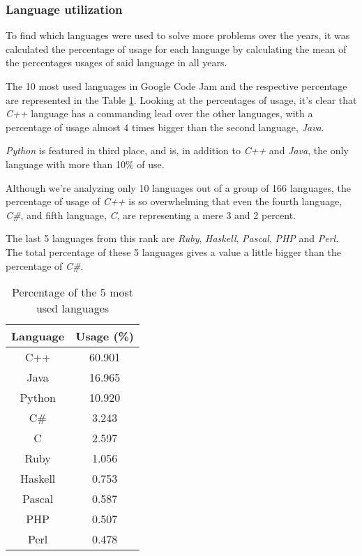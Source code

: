 \documentclass{article}
\begin{document}
\begin{multicols*}{2}
\subsubsection{Language utilization}

To find which languages were used to solve more problems over the years, it was calculated the percentage of usage for each language by calculating the mean of the percentages usages of said language in all years.

The 10 most used languages in Google Code Jam and the respective percentage are represented in the Table \ref{lang_perc}.
Looking at the percentages of usage, it's clear that \textit{C++} language has a commanding lead over the other languages, with a percentage of usage almost 4 times bigger than the second language, \textit{Java}.

\textit{Python} is featured in third place, and is, in addition to \textit{C++} and \textit{Java}, the only language with more than 10\% of use.

Although we're analyzing only 10 languages out of a group of 166 languages, the percentage of usage of \textit{C++} is so overwhelming that even the fourth language, \textit{C\#}, and fifth language, \textit{C}, are representing a mere 3 and 2 percent.

The last 5 languages from this rank are \textit{Ruby}, \textit{Haskell}, \textit{Pascal}, \textit{PHP} and \textit{Perl}. The total percentage of these 5 languages gives a value a little bigger than the percentage of \textit{C\#}.

\begin{table}[H]
\centering
\caption{Percentage of the 5 most used languages}
\label{lang_perc}
\begin{tabular}{c|c}
\textbf{Language} & \textbf{Usage (\%)} \\ \hline
C++               & 60.901       \\
Java              & 16.965       \\
Python            & 10.920       \\
C\#               & 3.243        \\
C                 & 2.597        \\
Ruby              & 1.056        \\
Haskell           & 0.753        \\
Pascal            & 0.587        \\
PHP               & 0.507        \\
Perl              & 0.478
\end{tabular}
\end{table}


\end{multicols*}
\end{document}
